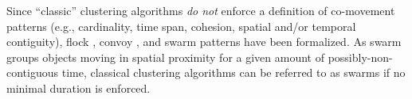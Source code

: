 \documentclass[
]{ceurart}
\begin{document}
Since ``classic'' clustering algorithms \textit{do not} enforce a definition of co-movement patterns (e.g., cardinality, time span, cohesion, spatial and/or temporal contiguity), flock \citep{DBLP:conf/gis/GudmundssonK06}, convoy \citep{DBLP:journals/pvldb/JeungYZJS08}, and swarm \citep{DBLP:conf/ssdbm/AungT10} patterns have been formalized.
As swarm \citep{DBLP:conf/ssdbm/AungT10} groups objects moving in spatial proximity for a given amount of possibly-non-contiguous time,
classical clustering algorithms can be referred to as swarms if no minimal duration is enforced.
\end{document}

